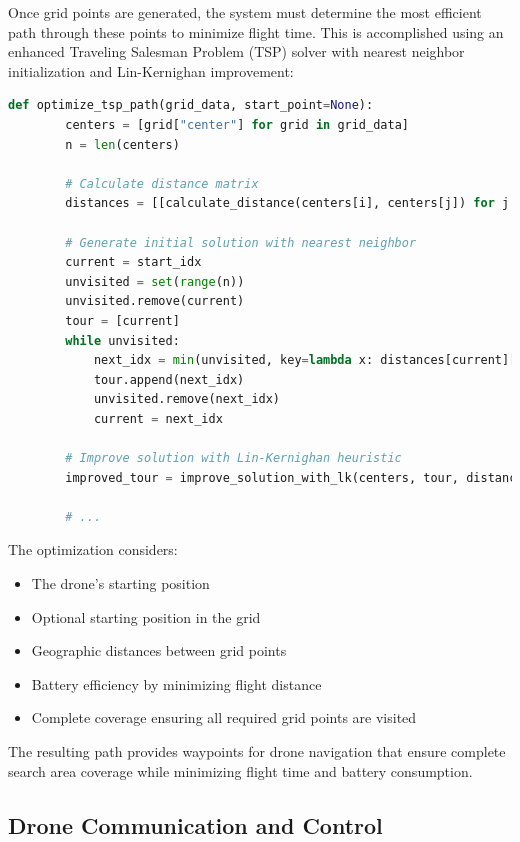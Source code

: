     Once grid points are generated, the system must determine the most efficient path through these points to minimize flight time. This is accomplished using an enhanced Traveling Salesman Problem (TSP) solver with nearest neighbor initialization and Lin-Kernighan improvement:
    
    \begin{lstlisting}[language=Python]
    def optimize_tsp_path(grid_data, start_point=None):
        centers = [grid["center"] for grid in grid_data]
        n = len(centers)
        
        # Calculate distance matrix
        distances = [[calculate_distance(centers[i], centers[j]) for j in range(n)] for i in range(n)]
        
        # Generate initial solution with nearest neighbor
        current = start_idx
        unvisited = set(range(n))
        unvisited.remove(current)
        tour = [current]
        while unvisited:
            next_idx = min(unvisited, key=lambda x: distances[current][x])
            tour.append(next_idx)
            unvisited.remove(next_idx)
            current = next_idx
        
        # Improve solution with Lin-Kernighan heuristic
        improved_tour = improve_solution_with_lk(centers, tour, distances)
        
        # ...
    \end{lstlisting}
    
    The optimization considers:
    \begin{itemize}
        \item The drone's starting position
        \item Optional starting position in the grid
        \item Geographic distances between grid points
        \item Battery efficiency by minimizing flight distance
        \item Complete coverage ensuring all required grid points are visited
    \end{itemize}
    
    The resulting path provides waypoints for drone navigation that ensure complete search area coverage while minimizing flight time and battery consumption.
    
    \subsection{Drone Communication and Control}
    
